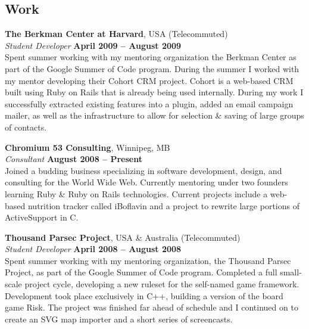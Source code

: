 \documentclass[margin,line,letterpaper]{resume}
\begin{document}
\begin{resume}
  \section{\mysidestyle Work}

  {\bf The Berkman Center at Harvard}, USA (Telecommuted) \vspace{2mm}\\\vspace{1mm}%
  {\sl Student Developer } \hfill {\bf April 2009 -- August 2009}\\
  Spent summer working with my mentoring organization the Berkman Center as part of the Google Summer of Code program. During the summer I worked with my mentor developing their Cohort CRM project. Cohort is a web-based CRM built using Ruby on Rails that is already being used internally. During my work I successfully extracted existing features into a plugin, added an email campaign mailer, as well as the infrastructure to allow for selection \& saving of large groups of contacts. 

  {\bf Chromium 53 Consulting}, Winnipeg, MB \vspace{2mm}\\\vspace{1mm}%
  {\sl Consultant} \hfill {\bf August 2008 -- Present}\\
  Joined a budding business specializing in software development, design, and
  consulting for the World Wide Web. Currently mentoring under two founders learning Ruby \& Ruby on Rails technologies. Current projects include a web-based nutrition tracker called iBoflavin and a project to rewrite large portions of ActiveSupport in C.

  {\bf Thousand Parsec Project}, USA \& Australia (Telecommuted) \vspace{2mm}\\\vspace{1mm}%
  {\sl Student Developer } \hfill {\bf April 2008 -- August 2008}\\
  Spent summer working with my mentoring organization, the Thousand Parsec Project, as part of the Google Summer of Code program. Completed a full small-scale project cycle, developing a new ruleset for the self-named game framework. Development took place exclusively in C++, building a version of the board game Risk. The project was finished far ahead of schedule and I continued on to create an SVG map importer and a short series of screencasts.


\end{resume}
\end{document}

